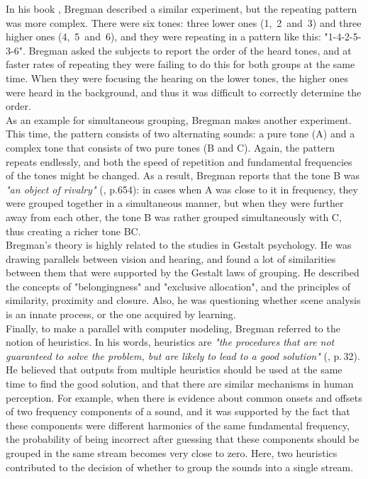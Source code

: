 In his book \cite{Bregman1990}, Bregman described a similar experiment, but the repeating pattern was more complex. There were six tones: three lower ones (1,~2~and~3) and three higher ones (4,~5~and~6), and they were repeating in a pattern like this: "1-4-2-5-3-6". Bregman asked the subjects to report the order of the heard tones, and at faster rates of repeating they were failing to do this for both groups at the same time. When they were focusing the hearing on the lower tones, the higher ones were heard in the background, and thus it was difficult to correctly determine the order.\\

As an example for simultaneous grouping, Bregman makes another experiment. This time, the pattern consists of two alternating sounds: a pure tone (A) and a complex tone that consists of two pure tones (B and C). Again, the pattern repeats endlessly, and both the speed of repetition and fundamental frequencies of the tones might be changed. As a result, Bregman reports that the tone B was \textit{"an object of rivalry"} (\cite{Bregman1990}, p.654): in cases when A was close to it in frequency, they were grouped together in a simultaneous manner, but when they were further away from each other, the tone B was rather grouped simultaneously with C, thus creating a richer tone BC.\\

Bregman's theory is highly related to the studies in Gestalt psychology. He was drawing parallels between vision and hearing, and found a lot of similarities between them that were supported by the Gestalt laws of grouping. He described the concepts of "belongingness" and "exclusive allocation", and the principles of similarity, proximity and closure. Also, he was questioning whether scene analysis is an innate process, or the one acquired by learning.\\

Finally, to make a parallel with computer modeling, Bregman referred to the notion of heuristics. In his words, heuristics are \textit{"the procedures that are not guaranteed to solve the problem, but are likely to lead to a good solution"} (\cite{Bregman1990}, p.\,32). He believed that outputs from multiple heuristics should be used at the same time to find the good solution, and that there are similar mechanisms in human perception. For example, when there is evidence about common onsets and offsets of two frequency components of a sound, and it was supported by the fact that these components were different harmonics of the same fundamental frequency, the probability of being incorrect after guessing that these components should be grouped in the same stream becomes very close to zero. Here, two heuristics contributed to the decision of whether to group the sounds into a single stream.

